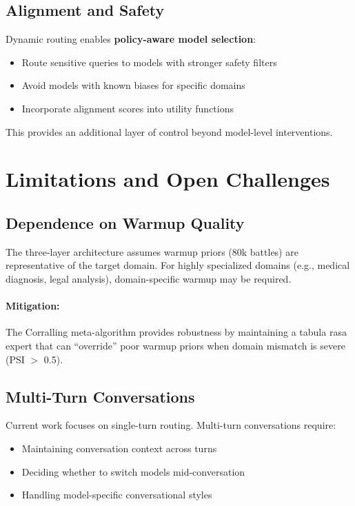 \documentclass[sigconf]{acmart}
\begin{document}
\subsection{Alignment and Safety}

Dynamic routing enables \textbf{policy-aware model selection}:
\begin{itemize}
    \item Route sensitive queries to models with stronger safety filters
    \item Avoid models with known biases for specific domains
    \item Incorporate alignment scores into utility functions
\end{itemize}

This provides an additional layer of control beyond model-level interventions.

\section{Limitations and Open Challenges}

\subsection{Dependence on Warmup Quality}

The three-layer architecture assumes warmup priors (80k battles) are representative of the target domain. For highly specialized domains (e.g., medical diagnosis, legal analysis), domain-specific warmup may be required.

\paragraph{Mitigation:} The Corralling meta-algorithm provides robustness by maintaining a tabula rasa expert that can ``override'' poor warmup priors when domain mismatch is severe (PSI $>$ 0.5).

\subsection{Multi-Turn Conversations}

Current work focuses on single-turn routing. Multi-turn conversations require:
\begin{itemize}
    \item Maintaining conversation context across turns
    \item Deciding whether to switch models mid-conversation
    \item Handling model-specific conversational styles
\end{itemize}
\end{document}
